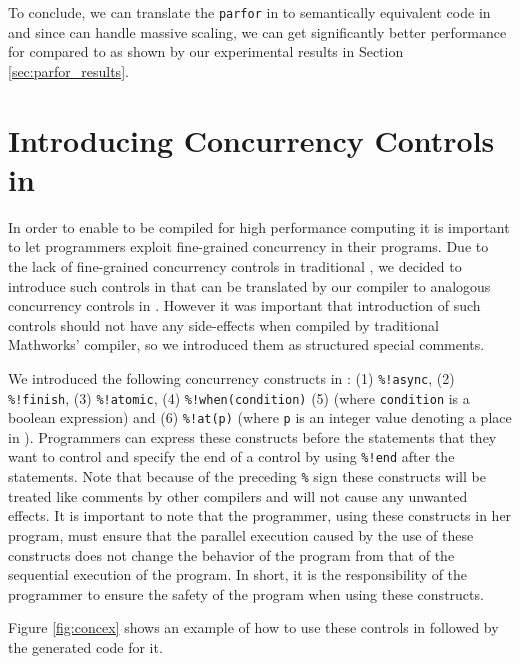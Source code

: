 To conclude, we can translate the \verb|parfor| in \matlab to
semantically equivalent code in \xten and since \xten can handle massive
scaling, we can get significantly better performance for \xten compared
to \matlab as shown by our experimental results in Section
\ref{sec:parfor_results}.

\section{Introducing Concurrency Controls in \matlab}

In order to enable \matlab to be compiled for high performance computing
it is important to let programmers exploit fine-grained concurrency in
their \matlab programs. Due to the lack of fine-grained concurrency
controls in traditional \matlab, we decided to introduce such controls
in \matlab that can be translated by our \mixten compiler to analogous
concurrency controls in \xten. However it was important that
introduction of such controls should not have any side-effects when
compiled by traditional Mathworks' \matlab compiler, so we introduced
them as structured special comments. 

We introduced the following concurrency constructs in \matlab: (1)
\verb|%!async|, (2) \verb|%!finish|, (3) \verb|%!atomic|, (4)
\verb|%!when(condition)| (5) (where \verb|condition| is a boolean expression)
and (6) \verb|%!at(p)| (where \verb|p| is an integer value denoting a place in
\xten).  Programmers can express these constructs before the statements that
they want to control and specify the end of a control by using \verb|%!end|
after the statements. Note that because of the preceding \verb|%| sign these
constructs will be treated like comments by other \matlab compilers and will not
cause any unwanted effects.  It is important to note that the \matlab
programmer, using these constructs in her program, must ensure that the parallel
execution caused by the use of these constructs does not change the behavior of
the program from that of the sequential execution of the program. In short, it
is the responsibility of the programmer to ensure the safety
of the program when using these constructs. 

Figure \ref{fig:concex} 
shows an example of how to use these controls in
\matlab followed by the generated \xten code for it.   

